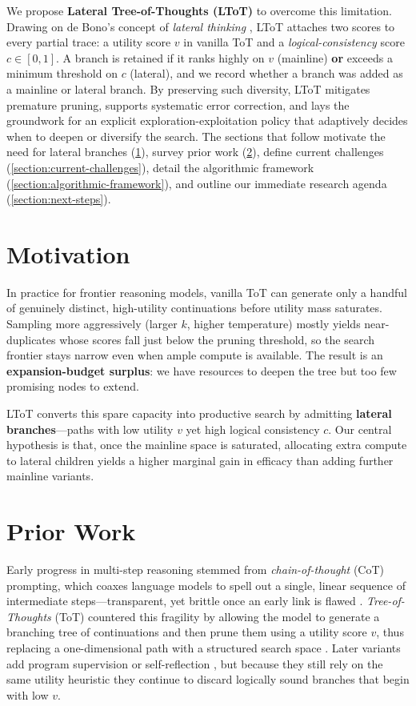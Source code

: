 \documentclass[onecolumn]{IEEEtran}
\begin{document}
We propose \textbf{Lateral Tree-of-Thoughts (LToT)} to overcome this limitation.
Drawing on de Bono's concept of \textit{lateral thinking} \cite{debono1967lateral}, LToT attaches two scores to every partial trace: a utility score $v$ in vanilla ToT and a \textit{logical-consistency} score $c \in [0, 1]$.
A branch is retained if it ranks highly on $v$ (mainline) \textbf{or} exceeds a minimum threshold on $c$ (lateral), and we record whether a branch was added as a mainline or lateral branch.
By preserving such diversity, LToT mitigates premature pruning, supports systematic error correction, and lays the groundwork for an explicit exploration-exploitation policy that adaptively decides when to deepen or diversify the search.
The sections that follow motivate the need for lateral branches (\ref{section:motivation}), survey prior work (\ref{section:prior-work}), define current challenges (\ref{section:current-challenges}), detail the algorithmic framework (\ref{section:algorithmic-framework}), and outline our immediate research agenda (\ref{section:next-steps}).


\section{Motivation}
\label{section:motivation}

In practice for frontier reasoning models, vanilla ToT can generate only a handful of genuinely distinct, high-utility continuations before utility mass saturates.
Sampling more aggressively (larger $k$, higher temperature) mostly yields near-duplicates whose scores fall just below the pruning threshold, so the search frontier stays narrow even when ample compute is available.
The result is an \textbf{expansion-budget surplus}: we have resources to deepen the tree but too few promising nodes to extend.

LToT converts this spare capacity into productive search by admitting \textbf{lateral branches}---paths with low utility $v$ yet high logical consistency $c$.
Our central hypothesis is that, once the mainline space is saturated, allocating extra compute to lateral children yields a higher marginal gain in efficacy than adding further mainline variants.


\section{Prior Work}
\label{section:prior-work}

Early progress in multi-step reasoning stemmed from \textit{chain-of-thought} (CoT) prompting, which coaxes language models to spell out a single, linear sequence of intermediate steps—transparent, yet brittle once an early link is flawed \cite{wei2022cot}.
\textit{Tree-of-Thoughts} (ToT) countered this fragility by allowing the model to generate a branching tree of continuations and then prune them using a utility score $v$, thus replacing a one-dimensional path with a structured search space \cite{yao2023tot}.
Later variants add program supervision \cite{gao2022pal} or self-reflection \cite{madaan2023selfrefine}, but because they still rely on the same utility heuristic they continue to discard logically sound branches that begin with low $v$.
\end{document}
